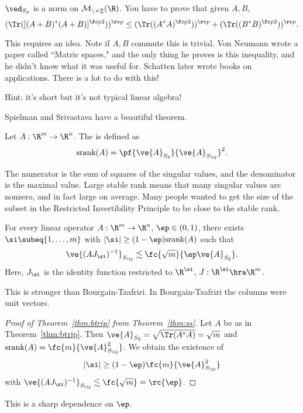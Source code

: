 \begin{exr}
$\ved_{S_p}$ is a norm on $\cal M_{n\times m}(\R)$. You have to prove that given $A,B$,
\[
(\Tr([(A+B)^*(A+B)]^{\fc p2}))^{\rc p}
\le
(\Tr((A^*A)^{\fc p2}))^{\rc p}+(\Tr((B^*B)^{\fc p2}))^{\rc p}.
\]
\end{exr}
This requires an idea. Note if $A,B$ commute this is trivial. Von Neumann wrote a paper called ``Matric spaces," and the only thing he proves is this inequality, and he didn't know what it was useful for. Schatten later wrote books on applications. There is a lot to do with this!

Hint: it's short but it's not typical linear algebra!

Spielman and Srivastava have a beautiful theorem. %
\begin{df}
Let $A:\R^m \to \R^n$. 
The  is defined as
\[
\text{srank}(A)=\pf{\ve{A}_{S_2}}{\ve{A}_{S_\iy}}^2.
\]
\end{df}
The numerator is the sum of squares of the singular values, and the denominator is the maximal value. Large stable rank means that many singular values are nonzero, and in fact large on average. Many people wanted to get the size of the subset in the Restricted Invertibility Principle  
to be close to the stable rank.


\begin{thm}
For every linear operator $A:\R^m\to \R^n$, $\ep\in (0,1)$, 
there exists $\si\subeq \{1,\ldots, m\}$ with $|\si|\ge (1-\ep)\text{srank}(A)$ such that
\[
\ve{(AJ_\si)^{-1}}_{S_{\iy}} \lesssim \fc{\sqrt m}{\ep\ve{A}_{S_2}}.
\]
Here, $J_\si$ is the identity function restricted to $\R^{\si}$,  $J:\R^{\si}\hra \R^m$. 
\end{thm}
This is stronger than Bourgain-Tzafriri. In Bourgain-Tzafriri the columns were unit vectors. 
\begin{proof}[Proof of Theorem~\ref{thm:btrip} from Theorem~\ref{thm:ss}]
Let $A$ be as in Theorem~\ref{thm:btrip}. Then $\ve{A}_{S_2}=\sqrt{\Tr(A^*A)}=\sqrt m$ and $\text{srank}(A)=\fc{m}{\ve{A}^2_{S_{\iy}}}$. We obtain the existence of 
\[
|\si|\ge (1-\ep)\fc{m}{\ve{A}^2_{S_{\iy}}}
\]
with $\ve{(AJ_{\si})^{-1}}_{S_{\iy}}\lesssim \fc{\sqrt m}=\rc{\ep}$.
\end{proof}
This is a sharp dependence on $\ep$.

